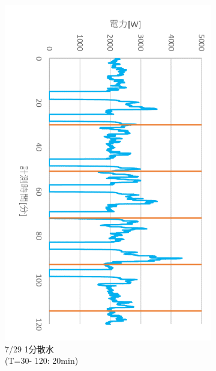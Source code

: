 \documentclass[a4j,fleqn,dvipdfmx,uplatex]{jsarticle}
\begin{document}
\begin{figure}[htb]
\begin{subfigure}[t]{0.32\linewidth}
    \includegraphics[width=\linewidth]{img/t_p/20220729.png}
    \caption{7/29 1分散水\\(T=30- 120: 20min)}\label{fig:i}
  \end{subfigure}
  \begin{subfigure}[t]{0.32\linewidth}
    \centering

\end{subfigure}
\end{figure}
\end{document}
